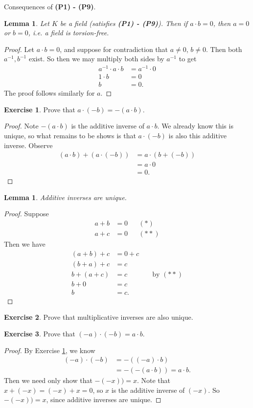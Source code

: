 \documentclass[12pt]{amsbook}
\theoremstyle{plain}
\numberwithin{section}{chapter}
\numberwithin{equation}{chapter}
\newtheorem{lem}[theorem]{Lemma}
\theoremstyle{definition}
\newtheorem{e}{Exercise}
\theoremstyle{remark}
\theoremstyle{plain}
\newcommand{\bee}{\begin{equation}\begin{aligned}}
\newcommand{\eee}{\end{aligned}\end{equation}}
\begin{document}
Consequences of \textbf{(P1) - (P9)}. 

\begin{lem}
Let $K$ be a field (satisfies \textbf{(P1) - (P9)}). Then if $a \cdot b = 0$, then $a = 0$ or $b = 0$, i.e. a field is torsion-free. 
\end{lem}
\begin{proof}
Let $a \cdot b = 0$, and suppose for contradiction that $a \neq 0$, $b \neq 0$. Then both $a^{-1},b^{-1}$ exist. So then we may multiply both sides by $a^{-1}$ to get
\bee
a^{-1} \cdot a \cdot b &= a^{-1} \cdot 0\\
1 \cdot b &= 0\\
b &= 0.
\eee
The proof follows similarly for $a$. 
\end{proof}

\begin{e}\label{exercise3}
Prove that $a \cdot (-b) = -(a \cdot b)$. 
\end{e}

\begin{proof}
Note $-(a \cdot b)$ is the additive inverse of $a \cdot b$. We already know this is unique, so what remains to be shows is that $a \cdot (-b)$ is also this additive inverse. Observe
\bee
(a \cdot b) + (a \cdot (-b)) &= a \cdot (b + (-b))\\
&= a \cdot 0\\
&= 0.
\eee
\end{proof}

\begin{lem}
Additive inverses are unique. 
\end{lem}
\begin{proof}
Suppose
\bee
a + b &= 0 && (*)\\
a + c &= 0 && (**)
\eee
Then we have
\bee
(a + b) + c &= 0 + c\\
(b + a) + c &= c\\
b + (a + c) &= c && \text{ by }(**)\\
b + 0 &= c\\
b &= c.
\eee
\end{proof}

\begin{e}
Prove that multiplicative inverses are also unique. 
\end{e}

\begin{e}
Prove that $(-a)\cdot(-b) = a \cdot b$. 
\end{e}

\begin{proof}
By Exercise \ref{exercise3}, we know
\bee
(-a)\cdot(-b) &= - ((-a) \cdot b)\\
&=- ( - (a \cdot b)) = a \cdot b. 
\eee
Then we need only show that $-(-x)) = x$. Note that $x + (-x) = (-x) + x = 0$, so $x$ is the additive inverse of $(-x)$. So $-(-x)) = x$, since additive inverses are unique. 
\end{proof}
\end{document}
